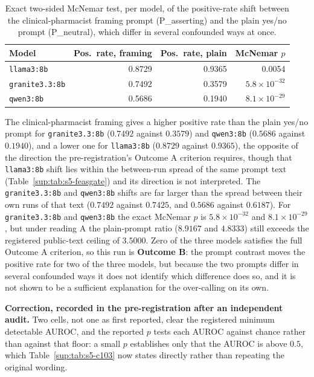 \begin{table}[H]
\caption[C103, McNemar test of P\_asserting against P\_neutral]{Exact
two-sided McNemar test, per model, of the positive-rate shift between the
clinical-pharmacist framing prompt (P\_asserting) and the plain yes/no prompt
(P\_neutral), which differ in several confounded ways at once.}
\centering
\begin{tabular}{lrrr}
\toprule
\textbf{Model} & \textbf{Pos.\ rate, framing} & \textbf{Pos.\ rate, plain} & \textbf{McNemar $p$} \\
\midrule
\texttt{llama3:8b}     & 0.8729 & 0.9365 & 0.0054 \\
\texttt{granite3.3:8b} & 0.7492 & 0.3579 & $5.8\times10^{-32}$ \\
\texttt{qwen3:8b}      & 0.5686 & 0.1940 & $8.1\times10^{-29}$ \\
\bottomrule
\end{tabular}
\label{sup:tab:s5-c103-mcnemar}
\end{table}

The clinical-pharmacist framing gives a higher positive rate than the plain
yes/no prompt for \texttt{granite3.3:8b} ($0.7492$ against $0.3579$) and
\texttt{qwen3:8b} ($0.5686$ against $0.1940$), and a lower one for
\texttt{llama3:8b} ($0.8729$ against $0.9365$), the opposite of the direction
the pre-registration's Outcome A criterion requires, though that
\texttt{llama3:8b} shift lies within the between-run spread of the same prompt
text (Table~\ref{sup:tab:s5-feasgate}) and its direction is not interpreted.
The \texttt{granite3.3:8b} and \texttt{qwen3:8b} shifts are far larger than the
spread between their own runs of that text ($0.7492$ against $0.7425$, and
$0.5686$ against $0.6187$). For
\texttt{granite3.3:8b} and \texttt{qwen3:8b} the exact McNemar $p$ is
$5.8\times10^{-32}$ and $8.1\times10^{-29}$, but under reading A the
plain-prompt ratio ($8.9167$ and $4.8333$) still exceeds the registered
public-text ceiling of $3.5000$. Zero of the three models satisfies the full
Outcome A criterion, so this run is \textbf{Outcome B}: the prompt contrast
moves the positive rate for two of the three models, but because the two
prompts differ in several confounded ways it does not identify which
difference does so, and it is not shown to be a sufficient explanation for the
over-calling on its own.

\textbf{Correction, recorded in the pre-registration after an independent
audit.} Two cells, not one as first
reported, clear the registered minimum detectable AUROC, and the reported
$p$ tests each AUROC against chance rather than against that floor: a small
$p$ establishes only that the AUROC is above $0.5$, which Table~\ref{sup:tab:s5-c103}
now states directly rather than repeating the original wording.

